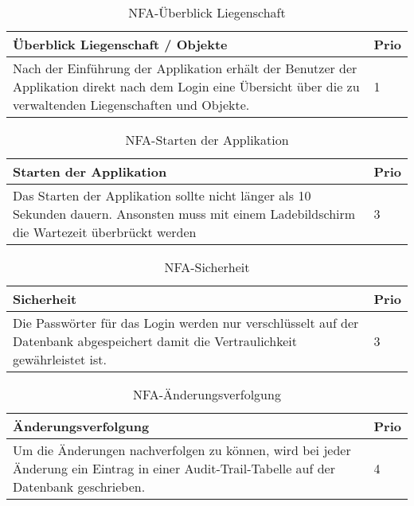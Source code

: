 \begin{table}[H]
  \centering
  \settowidth{}
  \setlength\extrarowheight{2pt}
  \begin{tabulary}{1.0\textwidth}{|m{16cm}|L|}
    \hline
    \textbf{Überblick Liegenschaft / Objekte}&\textbf{Prio}\\
    \hline
    Nach der Einführung der Applikation erhält der Benutzer der Applikation direkt nach dem Login eine Übersicht über die zu verwaltenden Liegenschaften und Objekte. & 1\\ 
    \hline
  \end{tabulary}
  \caption{NFA-Überblick Liegenschaft}
\end{table}

\begin{table}[H]
  \centering
  \settowidth{}
  \setlength\extrarowheight{2pt}
  \begin{tabulary}{1.0\textwidth}{|m{16cm}|L|}
    \hline
    \textbf{Starten der Applikation}&\textbf{Prio}\\
    \hline
    Das Starten der Applikation sollte nicht länger als 10 Sekunden dauern. Ansonsten muss mit einem Ladebildschirm die Wartezeit überbrückt werden & 3\\ 
    \hline
  \end{tabulary}
  \caption{NFA-Starten der Applikation}
\end{table}

\begin{table}[H]
  \centering
  \settowidth{}
  \setlength\extrarowheight{2pt}
  \begin{tabulary}{1.0\textwidth}{|m{16cm}|L|}
    \hline
    \textbf{Sicherheit}&\textbf{Prio}\\
    \hline
    Die Passwörter für das Login werden nur verschlüsselt auf der Datenbank abgespeichert damit die Vertraulichkeit gewährleistet ist. & 3\\ 
    \hline
  \end{tabulary}
  \caption{NFA-Sicherheit}
\end{table}

\begin{table}[H]
  \centering
  \settowidth{}
  \setlength\extrarowheight{2pt}
  \begin{tabulary}{1.0\textwidth}{|m{16cm}|L|}
    \hline
    \textbf{Änderungsverfolgung}&\textbf{Prio}\\
    \hline
     Um die Änderungen nachverfolgen zu können, wird bei jeder Änderung ein Eintrag in einer Audit-Trail-Tabelle auf der Datenbank geschrieben. & 4\\
    \hline
  \end{tabulary}
  \caption{NFA-Änderungsverfolgung}
\end{table}